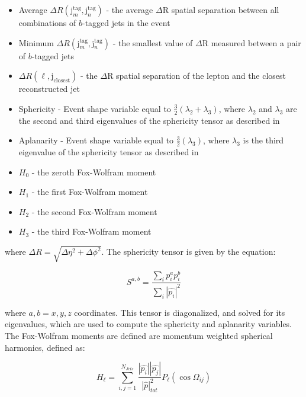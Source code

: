 \begin{itemize}
  \item Average $\Delta
    R(\text{j}_m^{\text{tag}},\text{j}_n^{\text{tag}})$  - the average
    $\Delta$R spatial separation between all combinations of $b$-tagged
    jets in the event
  \item Minimum $\Delta
    R(\text{j}_m^{\text{tag}},\text{j}_n^{\text{tag}})$ - the smallest
    value of $\Delta$R measured between a pair of $b$-tagged jets
  \item $\Delta R(\ell,\text{j}_{\text{closest}})$ - the $\Delta$R
    spatial separation of the lepton and the closest reconstructed jet
  \item Sphericity - Event shape variable equal to $\frac{3}{2}
    (\lambda_{2} + \lambda_{3})$, where $\lambda_{2}$ and
    $\lambda_{3}$ are the second and third eigenvalues of the
    sphericity tensor as described in\cite{sphericity} 
  \item Aplanarity - Event shape variable equal to
    \(\frac{3}{2}(\lambda_{3})\), where \(\lambda_{3}\) is the third
    eigenvalue of the sphericity tensor as described in 
  \item $H_0$ - the zeroth Fox-Wolfram moment ~\cite{FoxWolfram}
  \item $H_1$ - the first Fox-Wolfram moment 
  \item $H_2$ - the second Fox-Wolfram moment
  \item $H_3$ - the third Fox-Wolfram moment
\end{itemize}

\noindent where $\Delta R = \sqrt{\Delta\eta^{2} + \Delta\phi^{2}}$.
The sphericity tensor is given by the equation:

\begin{equation}\label{eq:sphericity_tensor}
S^{a,b} = \frac{ \sum_{i}p_{i}^{a}p_{i}^{b} }{ \sum_{i} |\hat{p_{i}}|^{2} }
\end{equation}

\noindent where $a,b = x,y,z$ coordinates.  This tensor is
diagonalized, and solved for its eigenvalues, which are used to
compute the sphericity and aplanarity variables.  The Fox-Wolfram
moments are defined are momentum weighted spherical harmonics, defined
as: 

\begin{equation}\label{eq:fox_wolfram}
H_{\ell} = \sum_{i,j=1}^{N_{Jets}} \frac{ |\hat{p_{i}}||\hat{p_{j}}|
}{ |\hat{p}|_{tot}^{2} } P_{\ell}(\cos{\Omega_{ij}})
\end{equation}

